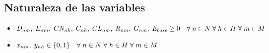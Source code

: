 \documentclass{article}
\begin{document}
\begin{flushleft}
		\subsection{Naturaleza de las variables}
		\begin{itemize}
			\item $D_{nm},\hspace{1mm} E_{nm},\hspace{1mm} CN_{nh},\hspace{1mm} C_{nh},\hspace{1mm} CL_{nm},\hspace{1mm} R_{nm},\hspace{1mm} G_{nm},\hspace{1mm} E_{base} \geq 0 \hspace{1em} \forall \hspace{1mm} n \in N \hspace{1mm} \forall \hspace{1mm} h \in H \hspace{1mm} \forall \hspace{1mm} m \in M $
			\item $x_{nm},\hspace{1mm} y_{nh} \in \{0,1\} \hspace{1em}\forall \hspace{1mm} n \in N \hspace{1mm} \forall \hspace{1mm} h \in H \hspace{1mm} \forall \hspace{1mm} m \in M$
		\end{itemize}
	\end{flushleft}	
\end{document}
